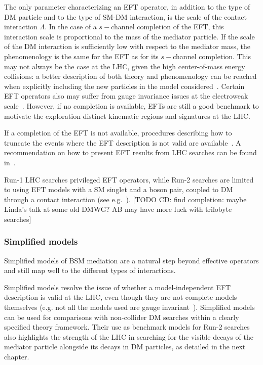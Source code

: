 The only parameter characterizing an EFT operator, in addition to the type of DM particle and to the type of SM-DM interaction, is the scale of the contact interaction $\Lambda$. In the case of a $s-$channel completion of the EFT, this interaction scale is proportional to the mass of the mediator particle. If the scale of the DM interaction is sufficiently low with respect to the mediator mass, the phenomenology is the same for the EFT as for its $s-$channel completion. 
This may not always be the case at the LHC, given the high center-of-mass energy collisions: a better description of both theory and phenomenology can be reached when explicitly including the new particles in the model considered~\cite{Buchmueller:2013dya,DeSimone:2016fbz,Berlin:2014cfa}. Certain EFT operators also may suffer from gauge invariance issues at the electroweak scale~\cite{Bell:2015sza}. However, if no completion is available, EFTs are still a good benchmark to motivate the exploration distinct kinematic regions and signatures at the LHC. %

\begin{marginnote}[]
If a completion of the EFT is not available, procedures describing how to truncate the events where the EFT description is not valid are available~\cite{Racco:2015dxa,Busoni:2014sya,Busoni:2013lha,Busoni:2014haa}. A recommendation on how to present EFT results from LHC searches can be found in~\cite{Abercrombie:2015wmb}.
\end{marginnote}

Run-1 LHC searches privileged EFT operators, while Run-2 searches are limited to using EFT models with a SM singlet and a boson pair, coupled to DM through a contact interaction (see e.g.~\cite{Petrov:2013nia,Berlin:2014cfa}). [TODO CD: find completion: maybe Linda's talk at some old DMWG? AB may have more luck with trilobyte searches]


\subsubsection{Simplified models}
\label{sub:simplifiedModels}
 
Simplified models of BSM mediation are a natural step beyond effective operators and still map well to the different types of interactions. 

Simplified models resolve the issue of whether a model-independent EFT description is valid at the LHC, even though they are not complete models themselves (e.g. not all the models used are gauge invariant~\cite{Kahlhoefer:2015bea}). Simplified models can be used for comparisons with non-collider DM searches within a clearly specified theory framework. Their use as benchmark models for Run-2 searches also highlights the strength of the LHC in searching for the visible decays of the mediator particle alongside its decays in DM particles, as detailed in the next chapter. 

